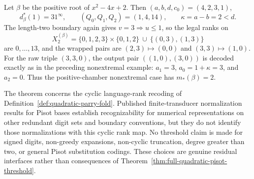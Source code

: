 \begin{example}
Let $\beta$ be the positive root of $x^2-4x+2$.  Then
$(a,b,d,c_0)=(4,2,3,1)$,
\[
d_\beta^*(1)=31^\infty,\qquad (Q_0,Q_1,Q_2)=(1,4,14),
\qquad \kappa=a-b=2<d.
\]
The length-two boundary again gives $v=3\Rightarrow u\le1$, so the legal
ranks on
\[
X_2^{(\beta)}=\{0,1,2,3\}\times\{0,1,2\}
\ \cup\ \{(0,3),(1,3)\}
\]
are $0,\ldots,13$, and the wrapped pairs are
$(2,3)\mapsto(0,0)$ and $(3,3)\mapsto(1,0)$.  For the raw triple $(3,3,0)$,
the output pair $((1,0),(3,0))$ is decoded exactly as in the preceding
nonextremal example: $a_1=3$, $a_0=1+\kappa=3$, and $a_2=0$.  Thus the
positive-chamber nonextremal case has $m_*(\beta)=2$.
\end{example}

\begin{remark}
\label{rem:quadratic-open-interface}
The theorem concerns the cyclic language-rank recoding of
Definition~\ref{def:quadratic-parry-fold}.  Published finite-transducer
normalization results for Pisot bases
\cite{Frougny1992,FrougnySteiner2008,BertheFrougnyRigoSakarovitch2019}
establish recognizability for numerical representations on other redundant
digit sets and boundary conventions, but they do not identify those
normalizations with this cyclic rank map.
No threshold claim is made for signed digits, non-greedy expansions,
non-cyclic truncation, degree greater than two, or general Pisot substitution
codings.  These choices are genuine residual interfaces rather than
consequences of Theorem~\ref{thm:full-quadratic-pisot-threshold}.
\end{remark}
